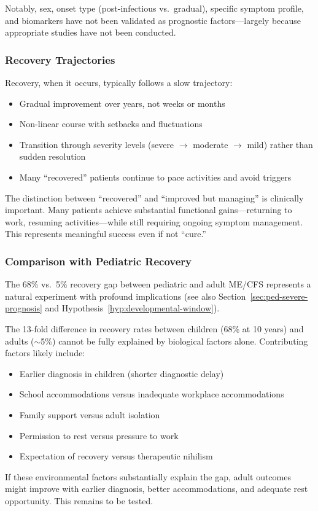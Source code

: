 Notably, sex, onset type (post-infectious vs.\ gradual), specific symptom profile, and biomarkers have not been validated as prognostic factors---largely because appropriate studies have not been conducted.

\subsubsection{Recovery Trajectories}

Recovery, when it occurs, typically follows a slow trajectory:
\begin{itemize}
    \item Gradual improvement over years, not weeks or months
    \item Non-linear course with setbacks and fluctuations
    \item Transition through severity levels (severe $\rightarrow$ moderate $\rightarrow$ mild) rather than sudden resolution
    \item Many ``recovered'' patients continue to pace activities and avoid triggers
\end{itemize}

The distinction between ``recovered'' and ``improved but managing'' is clinically important. Many patients achieve substantial functional gains---returning to work, resuming activities---while still requiring ongoing symptom management. This represents meaningful success even if not ``cure.''

\subsubsection{Comparison with Pediatric Recovery}

The 68\% vs.\ 5\% recovery gap between pediatric and adult ME/CFS represents a natural experiment with profound implications (see also Section~\ref{sec:ped-severe-prognosis} and Hypothesis~\ref{hyp:developmental-window}).

\begin{observation}
The 13-fold difference in recovery rates between children (68\% at 10 years) and adults ($\sim$5\%) cannot be fully explained by biological factors alone. Contributing factors likely include:
\begin{itemize}
    \item Earlier diagnosis in children (shorter diagnostic delay)
    \item School accommodations versus inadequate workplace accommodations
    \item Family support versus adult isolation
    \item Permission to rest versus pressure to work
    \item Expectation of recovery versus therapeutic nihilism
\end{itemize}
If these environmental factors substantially explain the gap, adult outcomes might improve with earlier diagnosis, better accommodations, and adequate rest opportunity. This remains to be tested.
\end{observation}

